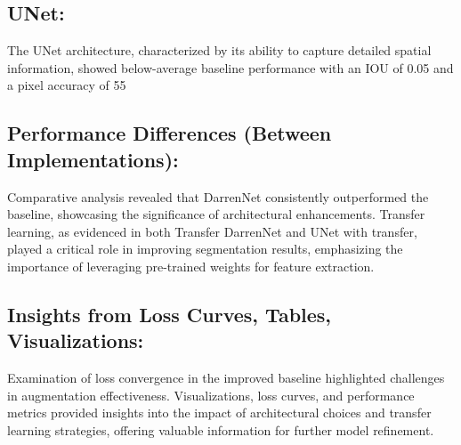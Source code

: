 \subsection*{UNet:}
The UNet architecture, characterized by its ability to capture detailed spatial information, showed below-average baseline performance with an IOU of 0.05 and a pixel accuracy of 55%

\subsection*{Performance Differences (Between Implementations):}
Comparative analysis revealed that DarrenNet consistently outperformed the baseline, showcasing the significance of architectural enhancements. Transfer learning, as evidenced in both Transfer DarrenNet and UNet with transfer, played a critical role in improving segmentation results, emphasizing the importance of leveraging pre-trained weights for feature extraction.

\subsection*{Insights from Loss Curves, Tables, Visualizations:}
Examination of loss convergence in the improved baseline highlighted challenges in augmentation effectiveness. Visualizations, loss curves, and performance metrics provided insights into the impact of architectural choices and transfer learning strategies, offering valuable information for further model refinement.


%
%
%
%
%
%

